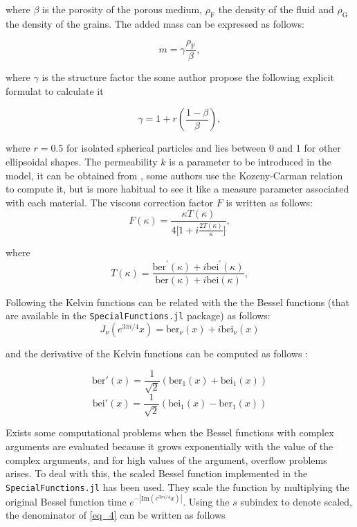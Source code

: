 \documentclass{article}[a4paper, 12pt]
\begin{document}
where $\beta$ is the porosity of the porous medium, $\rho_{\mathrm{F}}$ the density of the fluid and $\rho_{\mathrm{G}}$ the density of the grains. The added mass can be expressed as follows:

$$ m = \gamma\frac{\rho_\mathrm{F}}{\beta},$$

where $\gamma$ is the structure factor the some author propose the  following explicit formulat to calculate it 

$$ \gamma = 1+r\left(\frac{1-\beta}{\beta}\right), $$ 

where $r=0.5$ for isolated spherical particles and lies between 0 and 1 for other ellipsoidal shapes. The permeability $k$ is a parameter to be introduced in the model, it can be obtained from \cite{chotiros2017acoustics}, some authors use the Kozeny-Carman relation to compute it, but is more habitual to see it like a measure parameter associated with each material. The viscous correction factor $F$ is written as follows:
\begin{equation}
    F ( \kappa)=\frac{\kappa T ( \kappa)} {4 \bigg[ 1+i\displaystyle\frac{2 T ( \kappa)} {\kappa} \bigg]},
\end{equation}

where 
\begin{equation}\label{eq_4}
    T ( \kappa)={\frac{\mathrm{b e r}^{\prime} ( \kappa)+i \mathrm{b e i}^{\prime} ( \kappa)} {\mathrm{b e r} ( \kappa)+i \mathrm{b e i} ( \kappa)}},
\end{equation}

Following \cite{kelvinfunctions} the Kelvin functions can be related with the the Bessel functions (that are available in the \texttt{SpecialFunctions.jl} package) as follows:
$$ J_\nu(e^{3\pi i/4}x) = \mathrm{ber}_\nu(x) + i\mathrm{bei}_\nu(x)$$

and the derivative of the Kelvin functions can be computed as follows  \cite{dlmf_kelvin_2024}:


$$ \mathrm{ber}'(x) = \frac{1}{\sqrt{2}}\left(\mathrm{ber}_1(x) + \mathrm{bei}_1(x)\right) $$
$$ \mathrm{bei}'(x) = \frac{1}{\sqrt{2}}\left(\mathrm{bei}_1(x) - \mathrm{ber}_1(x)\right) $$

Exists some computational problems when the Bessel functions with complex arguments are evaluated because it grows exponentially with the value of the complex arguments, and for high values of the argument, overflow problems arises. To deal with this, the scaled Bessel function implemented in the \texttt{SpecialFunctions.jl} has been used. They scale the function by multiplying the original Bessel function time $e^{-\left\vert \mathrm{Im}(e^{3\pi i/4}x) \right\vert }$. Using the $s$ subindex to denote scaled, the denominator of \eqref{eq_4} can be written as follows 
\end{document}
